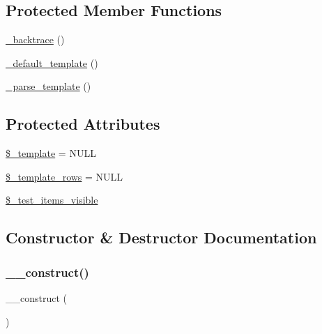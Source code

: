 \subsection*{Protected Member Functions}
\begin{DoxyCompactItemize}
\item 
\mbox{\hyperlink{class_c_i___unit__test_aae40ff64c7daf1d70efaf110181a257e}{\+\_\+backtrace}} ()
\item 
\mbox{\hyperlink{class_c_i___unit__test_ae1990fcb9ffc455614eeac9a1091f0b0}{\+\_\+default\+\_\+template}} ()
\item 
\mbox{\hyperlink{class_c_i___unit__test_a884e99b431f75c1ad17ba9753dab3b49}{\+\_\+parse\+\_\+template}} ()
\end{DoxyCompactItemize}
\subsection*{Protected Attributes}
\begin{DoxyCompactItemize}
\item 
\mbox{\hyperlink{class_c_i___unit__test_a353afce17912a98c6a9ead92e679570d}{\$\+\_\+template}} = N\+U\+LL
\item 
\mbox{\hyperlink{class_c_i___unit__test_a5d3e2ba4262eb08f117b1e6842f1f162}{\$\+\_\+template\+\_\+rows}} = N\+U\+LL
\item 
\mbox{\hyperlink{class_c_i___unit__test_aa8b5dd7058c9c945ed964e96777d72c4}{\$\+\_\+test\+\_\+items\+\_\+visible}}
\end{DoxyCompactItemize}


\subsection{Constructor \& Destructor Documentation}
\mbox{\label{class_c_i___unit__test_a095c5d389db211932136b53f25f39685}} 
\subsubsection{\texorpdfstring{\+\_\+\+\_\+construct()}{\_\_construct()}}
{\footnotesize\ttfamily \+\_\+\+\_\+construct (\begin{DoxyParamCaption}{ }\end{DoxyParamCaption})}

